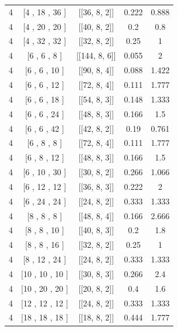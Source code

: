 \documentclass[%
reprint,
amsmath,amssymb,
aps,
]{revtex4-2}
\begin{document}
\begin{table}[b]
\begin{ruledtabular}
\begin{tabular}{|c|c|c|c|c|}
	4 & [4 , 18 , 36 ] & [[36, 8, 2]] & 0.222 & 0.888  \\
	4 & [4 , 20 , 20 ] & [[40, 8, 2]] & 0.2 & 0.8  \\
	4 & [4 , 32 , 32 ] & [[32, 8, 2]] & 0.25 & 1  \\
	4 & [6 , 6 , 8 ] & [[144, 8, 6]] & 0.055 & 2  \\
	4 & [6 , 6 , 10 ] & [[90, 8, 4]] & 0.088 & 1.422  \\
	4 & [6 , 6 , 12 ] & [[72, 8, 4]] & 0.111 & 1.777  \\
	4 & [6 , 6 , 18 ] & [[54, 8, 3]] & 0.148 & 1.333  \\
	4 & [6 , 6 , 24 ] & [[48, 8, 3]] & 0.166 & 1.5  \\
	4 & [6 , 6 , 42 ] & [[42, 8, 2]] & 0.19 & 0.761  \\
	4 & [6 , 8 , 8 ] & [[72, 8, 4]] & 0.111 & 1.777   \\
	4 & [6 , 8 , 12 ] & [[48, 8, 3]] & 0.166 & 1.5  \\
	4 & [6 , 10 , 30 ] & [[30, 8, 2]] & 0.266 & 1.066   \\
	4 & [6 , 12 , 12 ] & [[36, 8, 3]] & 0.222 & 2  \\
	4 & [6 , 24 , 24 ] & [[24, 8, 2]] & 0.333 & 1.333  \\
	4 & [8 , 8 , 8 ] & [[48, 8, 4]] & 0.166 & 2.666  \\
	4 & [8 , 8 , 10 ] & [[40, 8, 3]] & 0.2 & 1.8 \\
	4 & [8 , 8 , 16 ] & [[32, 8, 2]] & 0.25 & 1  \\
	4 & [8 , 12 , 24 ] & [[24, 8, 2]] & 0.333 & 1.333   \\
	4 & [10 , 10 , 10 ] & [[30, 8, 3]] & 0.266 & 2.4  \\
	4 & [10 , 20 , 20 ] & [[20, 8, 2]] & 0.4 & 1.6  \\
	4 & [12 , 12 , 12 ] & [[24, 8, 2]] & 0.333 & 1.333   \\
	4 & [18 , 18 , 18 ] & [[18, 8, 2]] & 0.444 & 1.777 \\
			\end{tabular}
	\end{ruledtabular}
\end{table}
\end{document}
